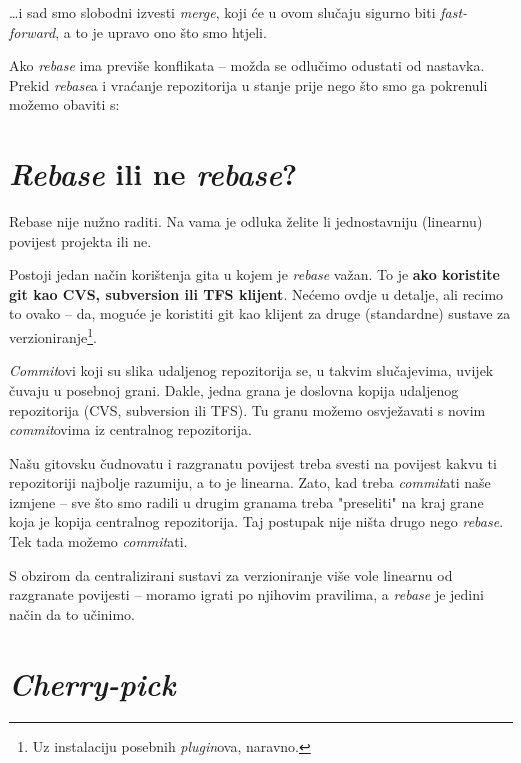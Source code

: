 

\dots{}i sad smo slobodni izvesti \emph{merge}, koji će u ovom slučaju sigurno biti \emph{fast-forward}, a to je upravo ono što smo htjeli.

Ako \emph{rebase} ima previše konflikata -- možda se odlučimo odustati od nastavka.
Prekid \emph{rebase}a i vraćanje repozitorija u stanje prije nego što smo ga pokrenuli možemo obaviti s:


\section*{\emph{Rebase} ili ne \emph{rebase}?}

Rebase nije nužno raditi.
Na vama je odluka želite li jednostavniju (linearnu) povijest projekta ili ne.

Postoji jedan način korištenja gita u kojem je \emph{rebase} važan.
To je \textbf{ako koristite git kao CVS, subversion ili TFS klijent}.
Nećemo ovdje u detalje, ali recimo to ovako -- da, moguće je koristiti git kao klijent za druge (standardne) sustave za verzioniranje\footnote{Uz instalaciju posebnih \emph{plugin}ova, naravno.}.

\emph{Commit}ovi koji su slika udaljenog repozitorija se, u takvim slučajevima, uvijek čuvaju u posebnoj grani.
Dakle, jedna grana je doslovna kopija udaljenog repozitorija (CVS, subversion ili TFS).
Tu granu možemo osvježavati s novim \emph{commit}ovima iz centralnog repozitorija.

Našu gitovsku čudnovatu i razgranatu povijest treba svesti na povijest kakvu ti repozitoriji najbolje razumiju, a to je linearna.
Zato, kad treba \emph{commit}ati naše izmjene -- sve što smo radili u drugim granama treba "preseliti" na kraj grane koja je kopija centralnog repozitorija.
Taj postupak nije ništa drugo nego \emph{rebase}.
Tek tada možemo \emph{commit}ati.

S obzirom da centralizirani sustavi za verzioniranje više vole linearnu od razgranate povijesti -- moramo igrati po njihovim pravilima, a \emph{rebase} je jedini način da to učinimo.

\section*{\emph{Cherry-pick}}

